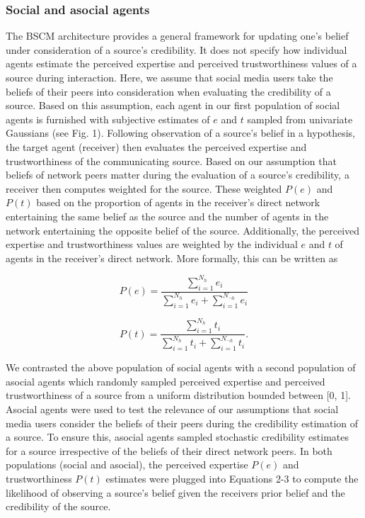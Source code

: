 \documentclass[doc,floatsintext]{apa6}
\begin{document}
\subsubsection{Social and asocial agents}
The BSCM architecture provides a general framework for updating one's belief under consideration of a source's credibility. It does not specify how individual agents estimate the perceived expertise and perceived trustworthiness values of a source during interaction. Here, we assume that social media users take the beliefs of their peers into consideration when evaluating the credibility of a source. Based on this assumption, each agent in our first population of social agents is furnished with subjective estimates of \(e\) and \(t\) sampled from univariate Gaussians (see Fig. 1). Following observation of a source's belief in a hypothesis, the target agent (receiver) then evaluates the perceived expertise and trustworthiness of the communicating source. Based on our assumption that beliefs of network peers matter during the evaluation of a source's credibility, a receiver then computes  weighted  for the source. These weighted \(P(e)\) and \(P(t)\) based on the proportion of agents in the receiver's direct network entertaining the same belief as the source and the number of agents in the network entertaining the opposite belief of the source. Additionally, the perceived expertise and trustworthiness values are weighted by the individual \(e\) and \(t\) of agents in the receiver's direct network. More formally, this can be written as  

\begin{equation}
    P(e) = \frac{\sum_{i=1}^{N_h}e_i}{\sum_{i=1}^{N_h}e_i + \sum_{i=1}^{N_{\neg h}}e_i}              
\end{equation}

\begin{equation}
    P(t) = \frac{\sum_{i=1}^{N_h}t_i}{\sum_{i=1}^{N_h}t_i + \sum_{i=1}^{N_{\neg h}}t_i}.
\end{equation}


We contrasted the above population of social agents with a second population of asocial agents which randomly sampled perceived expertise and perceived trustworthiness of a source from a uniform distribution bounded between [0, 1]. Asocial agents were used to test the relevance of our assumptions that social media users consider the beliefs of their peers during the credibility estimation of a source. To ensure this, asocial agents sampled stochastic credibility estimates for a source irrespective of the beliefs of their direct network peers. In both populations (social and asocial), the perceived expertise \(P(e)\) and trustworthiness \(P(t)\) estimates were plugged into Equations 2-3 to compute the likelihood of observing a source's belief given the receivers prior belief and the credibility of the source.
\end{document}
